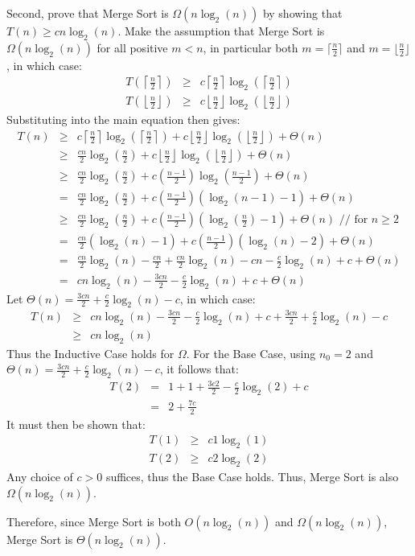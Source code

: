 \documentclass{article}
\begin{document}
Second, prove that Merge Sort is $\Omega(n\log_2(n))$ by showing that $T(n) \geq cn\log_2(n)$.  Make the assumption that Merge Sort is $\Omega(n\log_2(n))$ for all positive $m < n$, in particular both $m = \lceil \frac{n}{2} \rceil$ and $m = \lfloor \frac{n}{2} \rfloor$, in which case:
\begin{eqnarray*}
	T\left(\left\lceil \frac{n}{2} \right\rceil\right) &\geq& c\left\lceil\frac{n}{2}\right\rceil \log_2\left(\left\lceil\frac{n}{2}\right\rceil\right) \\
	T\left(\left\lfloor \frac{n}{2} \right\rfloor\right) &\geq& c\left\lfloor\frac{n}{2}\right\rfloor \log_2\left(\left\lfloor\frac{n}{2}\right\rfloor\right)
\end{eqnarray*}
Substituting into the main equation then gives:
\begin{eqnarray*}
	T(n) &\geq& c\left\lceil\frac{n}{2}\right\rceil \log_2\left(\left\lceil\frac{n}{2}\right\rceil\right) + c \left\lfloor\frac{n}{2}\right\rfloor \log_2\left(\left\lfloor\frac{n}{2}\right\rfloor\right) + \Theta(n) \\
	 &\geq& \frac{cn}{2}\log_2\left(\frac{n}{2}\right) + c\left\lfloor\frac{n}{2}\right\rfloor \log_2\left(\left\lfloor\frac{n}{2}\right\rfloor\right) + \Theta(n) \\
	 &\geq& \frac{cn}{2}\log_2\left(\frac{n}{2}\right) + c\left(\frac{n-1}{2}\right)\log_2\left(\frac{n-1}{2}\right) + \Theta(n) \\
	 &=& \frac{cn}{2}\log_2\left(\frac{n}{2}\right) + c\left(\frac{n-1}{2}\right)(\log_2(n-1)-1) + \Theta(n) \\
	 &\geq& \frac{cn}{2}\log_2\left(\frac{n}{2}\right) + c\left(\frac{n-1}{2}\right)\left(\log_2\left(\frac{n}{2}\right)-1\right) + \Theta(n) \text{ // for } n \geq 2 \\
	 &=& \frac{cn}{2}(\log_2(n)-1) + c\left(\frac{n-1}{2}\right)(\log_2(n)-2) + \Theta(n) \\
	 &=& \frac{cn}{2}\log_2(n) - \frac{cn}{2} + \frac{cn}{2}\log_2(n) - cn - \frac{c}{2}\log_2(n) + c + \Theta(n) \\
	 &=& cn\log_2(n) - \frac{3cn}{2} - \frac{c}{2}\log_2(n) + c + \Theta(n)
\end{eqnarray*}
Let $\Theta(n) = \frac{3cn}{2} + \frac{c}{2}\log_2(n) - c$, in which case:
\begin{eqnarray*}
	T(n) &\geq& cn\log_2(n) - \frac{3cn}{2} - \frac{c}{2}\log_2(n) + c + \frac{3cn}{2} + \frac{c}{2}\log_2(n) - c \\
	 &\geq& cn\log_2(n)
\end{eqnarray*}
Thus the Inductive Case holds for $\Omega$.  For the Base Case, using $n_0 = 2$ and $\Theta(n) = \frac{3cn}{2} + \frac{c}{2}\log_2(n) - c$, it follows that:
\begin{eqnarray*}
	T(2) &=& 1 + 1 + \frac{3c2}{2} - \frac{c}{2}\log_2(2) + c \\
	 &=& 2 + \frac{7c}{2}
\end{eqnarray*}
It must then be shown that:
\begin{eqnarray*}
	T(1) &\geq& c1\log_2(1) \\
	T(2) &\geq& c2\log_2(2)
\end{eqnarray*}
Any choice of $c > 0$ suffices, thus the Base Case holds.  Thus, Merge Sort is also $\Omega(n\log_2(n))$.

Therefore, since Merge Sort is both $O(n\log_2(n))$ and $\Omega(n\log_2(n))$, Merge Sort is $\Theta(n\log_2(n))$.
\end{document}
